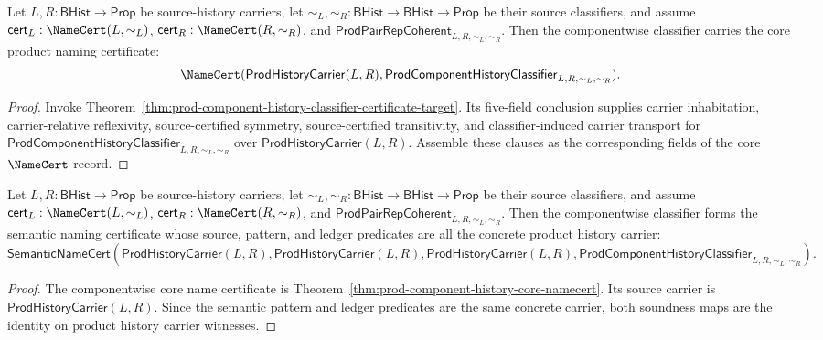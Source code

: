 \begin{theorem}
\label{thm:prod-component-history-core-namecert}
Let $L,R:\mathsf{BHist}\to\mathsf{Prop}$ be source-history carriers, let
$\sim_L,\sim_R:\mathsf{BHist}\to\mathsf{BHist}\to\mathsf{Prop}$ be their source
classifiers, and assume $\mathsf{cert}_L:\NameCert(L,\sim_L)$,
$\mathsf{cert}_R:\NameCert(R,\sim_R)$, and
$\mathsf{ProdPairRepCoherent}_{L,R,\sim_L,\sim_R}$. Then the componentwise
classifier carries the core product naming certificate:
$$
\NameCert(\mathsf{ProdHistoryCarrier}(L,R),
\mathsf{ProdComponentHistoryClassifier}_{L,R,\sim_L,\sim_R}).
$$
\end{theorem}
\begin{proof}
Invoke
Theorem~\ref{thm:prod-component-history-classifier-certificate-target}. Its
five-field conclusion supplies carrier inhabitation, carrier-relative
reflexivity, source-certified symmetry, source-certified transitivity, and
classifier-induced carrier transport for
$\mathsf{ProdComponentHistoryClassifier}_{L,R,\sim_L,\sim_R}$ over
$\mathsf{ProdHistoryCarrier}(L,R)$. Assemble these clauses as the corresponding
fields of the core $\NameCert$ record.
\end{proof}

\begin{theorem}
\label{thm:prod-component-history-classifier-semantic-name-certificate}
Let $L,R:\mathsf{BHist}\to\mathsf{Prop}$ be source-history carriers, let
$\sim_L,\sim_R:\mathsf{BHist}\to\mathsf{BHist}\to\mathsf{Prop}$ be their source
classifiers, and assume $\mathsf{cert}_L:\NameCert(L,\sim_L)$,
$\mathsf{cert}_R:\NameCert(R,\sim_R)$, and
$\mathsf{ProdPairRepCoherent}_{L,R,\sim_L,\sim_R}$. Then the componentwise
classifier forms the semantic naming certificate whose source, pattern, and
ledger predicates are all the concrete product history carrier:
$$
\mathsf{SemanticNameCert}(\mathsf{ProdHistoryCarrier}(L,R),
\mathsf{ProdHistoryCarrier}(L,R),
\mathsf{ProdHistoryCarrier}(L,R),
\mathsf{ProdComponentHistoryClassifier}_{L,R,\sim_L,\sim_R}).
$$
\end{theorem}
\begin{proof}
The componentwise core name certificate is
Theorem~\ref{thm:prod-component-history-core-namecert}. Its source carrier is
$\mathsf{ProdHistoryCarrier}(L,R)$. Since the semantic pattern and ledger
predicates are the same concrete carrier, both soundness maps are the identity
on product history carrier witnesses.
\end{proof}

